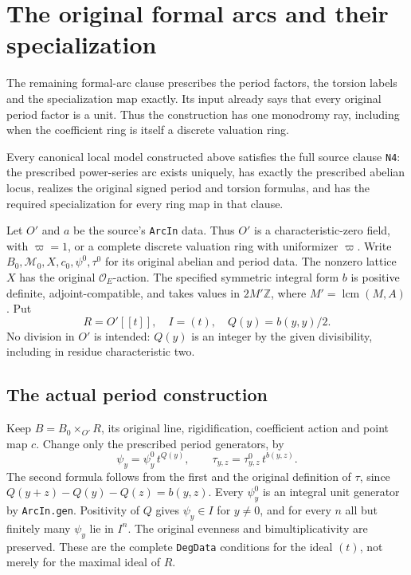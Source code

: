 \section{The original formal arcs and their specialization}
\label{sec:pel-formal-arcs}

The remaining formal-arc clause prescribes the period factors, the
torsion labels and the specialization map exactly.  Its input
already says that every original period factor is a unit.  Thus
the construction has one monodromy ray, including when the
coefficient ring is itself a discrete valuation ring.

\begin{theorem}
\label{thm:pel-original-arcs}
Every canonical local model constructed above satisfies the full
source clause \texttt{N4}: the prescribed power-series arc exists
uniquely, has exactly the prescribed abelian locus, realizes the
original signed period and torsion formulas, and has the required
specialization for every ring map in that clause.
\end{theorem}

Let $O'$ and $a$ be the source's \texttt{ArcIn} data.  Thus $O'$
is a characteristic-zero field, with $\varpi=1$, or a complete
discrete valuation ring with uniformizer $\varpi$.
Write $B_0,\mathscr M_0,X,c_0,\psi^0,\tau^0$ for its original
abelian and period data.  The nonzero lattice $X$ has the original
$\mathcal O_E$-action.  The specified symmetric integral form
$b$ is positive definite, adjoint-compatible, and takes values
in $2M'\mathbb Z$, where $M'=\operatorname{lcm}(M,A)$.
Put
\[
       R=O'[[t]],\quad I=(t),\quad Q(y)=b(y,y)/2.
\]
No division in $O'$ is intended: $Q(y)$ is an integer by the
given divisibility, including in residue characteristic two.

\subsection*{The actual period construction}

Keep $B=B_0\times_{O'}R$, its original line, rigidification,
coefficient action and point map $c$.  Change only the prescribed
period generators, by
\[
       \psi_y=\psi^0_y\,t^{Q(y)},\qquad
       \tau_{y,z}=\tau^0_{y,z}\,t^{b(y,z)}.
\]
The second formula follows from the first and the original
definition of $\tau$, since
$Q(y+z)-Q(y)-Q(z)=b(y,z)$.
Every $\psi^0_y$ is an integral unit generator by
\texttt{ArcIn.gen}.  Positivity of $Q$ gives
$\psi_y\in I$ for $y\ne0$, and for every $n$ all but finitely
many $\psi_y$ lie in $I^n$.  The original evenness and
bimultiplicativity are preserved.  These are the complete
\texttt{DegData} conditions for the ideal $(t)$, not merely for
the maximal ideal of $R$.

